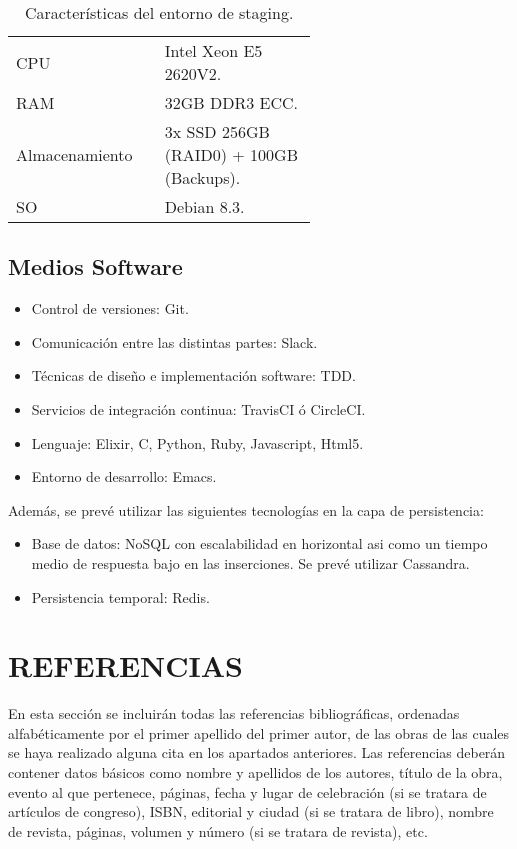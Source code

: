 \documentclass{pre-tfg}
\begin{document}
\begin{table}[hp]
  \caption{Características del entorno de staging.}
  \centering

  \begin{tabular}{p{0.2\linewidth}p{0.4\linewidth}}
    CPU& Intel Xeon E5 2620V2.\\
    RAM& 32GB DDR3 ECC.\\
    Almacenamiento& 3x SSD 256GB (RAID0) + 100GB (Backups).\\
    SO& Debian 8.3.\\
  \end{tabular}
\end{table}

\clearpage
\subsection{Medios Software}
\begin{itemize}
\item Control de versiones: Git.
\item Comunicación entre las distintas partes: Slack.
\item Técnicas de diseño e implementación software: TDD.
\item Servicios de integración continua: TravisCI ó CircleCI.
\item Lenguaje: Elixir, C, Python, Ruby, Javascript, Html5.
\item Entorno de desarrollo: Emacs.
\end{itemize}

Además, se prevé utilizar las siguientes tecnologías en la capa de
persistencia:

\begin{itemize}
\item Base de datos: NoSQL con escalabilidad en horizontal asi como un
  tiempo medio de respuesta bajo en las inserciones. Se prevé utilizar Cassandra.
\item Persistencia temporal: Redis.
\end{itemize}


\section{REFERENCIAS}

En esta sección se incluirán todas las referencias bibliográficas, ordenadas
alfabéticamente por el primer apellido del primer autor, de las obras de las cuales se
haya realizado alguna cita en los apartados anteriores. Las referencias deberán contener
datos básicos como nombre y apellidos de los autores, título de la obra, evento al que
pertenece, páginas, fecha y lugar de celebración (si se tratara de artículos de congreso),
ISBN, editorial y ciudad (si se tratara de libro), nombre de revista, páginas, volumen y
número (si se tratara de revista), etc.
\end{document}
